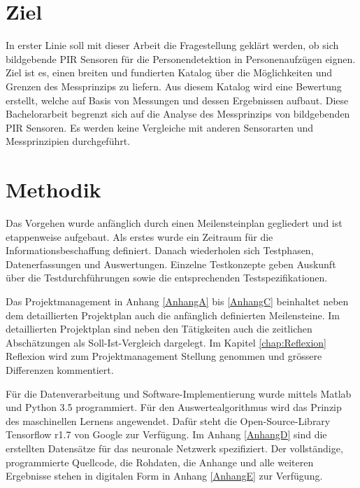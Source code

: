 \section{Ziel}
\label{sec:Einleitung}
In erster Linie soll mit dieser Arbeit die Fragestellung geklärt werden, ob sich bildgebende \ac{PIR} Sensoren für die Personendetektion in Personenaufzügen eignen. Ziel ist es, einen breiten und fundierten Katalog über die Möglichkeiten und Grenzen des Messprinzips zu liefern. Aus diesem Katalog wird eine Bewertung erstellt, welche auf Basis von Messungen und dessen Ergebnissen aufbaut. Diese Bachelorarbeit begrenzt sich auf die Analyse des Messprinzips von bildgebenden \ac{PIR} Sensoren. Es werden keine Vergleiche mit anderen Sensorarten und Messprinzipien durchgeführt.

\section {Methodik}
\label{sec:Methodik}
Das Vorgehen wurde anfänglich durch einen Meilensteinplan gegliedert und ist etappenweise aufgebaut. Als erstes wurde ein Zeitraum für die Informationsbeschaffung definiert. Danach wiederholen sich Testphasen, Datenerfassungen und Auswertungen. Einzelne Testkonzepte geben Auskunft über die Testdurchführungen sowie die entsprechenden Testspezifikationen. 

Das Projektmanagement in Anhang \ref{AnhangA} bis \ref{AnhangC} beinhaltet neben dem detaillierten Projektplan auch die anfänglich definierten Meilensteine. Im detaillierten Projektplan sind neben den Tätigkeiten auch die zeitlichen Abschätzungen als Soll-Ist-Vergleich dargelegt. Im Kapitel \ref{chap:Reflexion} Reflexion wird zum Projektmanagement Stellung genommen und grössere Differenzen kommentiert.

Für die Datenverarbeitung und Software-Implementierung wurde mittels Matlab und Python 3.5 programmiert. Für den Auswertealgorithmus wird das Prinzip des maschinellen Lernens angewendet. Dafür steht die Open-Source-Library Tensorflow r1.7 von Google zur Verfügung. Im Anhang \ref{AnhangD} sind die erstellten Datensätze für das neuronale Netzwerk spezifiziert. Der vollständige, programmierte Quellcode, die Rohdaten, die Anhange und alle weiteren Ergebnisse stehen in digitalen Form in  Anhang \ref{AnhangE} zur Verfügung. 



